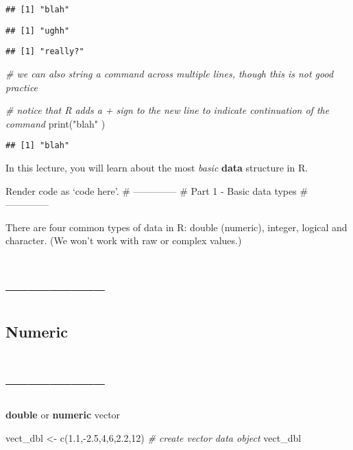 \documentclass[
]{article}
\newenvironment{Shaded}{\begin{snugshade}}{\end{snugshade}}
\newcommand{\CommentTok}[1]{\textcolor[rgb]{0.56,0.35,0.01}{\textit{#1}}}
\newcommand{\DecValTok}[1]{\textcolor[rgb]{0.00,0.00,0.81}{#1}}
\newcommand{\FloatTok}[1]{\textcolor[rgb]{0.00,0.00,0.81}{#1}}
\newcommand{\FunctionTok}[1]{\textcolor[rgb]{0.00,0.00,0.00}{#1}}
\newcommand{\NormalTok}[1]{#1}
\newcommand{\OtherTok}[1]{\textcolor[rgb]{0.56,0.35,0.01}{#1}}
\newcommand{\SpecialCharTok}[1]{\textcolor[rgb]{0.00,0.00,0.00}{#1}}
\newcommand{\StringTok}[1]{\textcolor[rgb]{0.31,0.60,0.02}{#1}}
\begin{document}
\begin{verbatim}
## [1] "blah"
\end{verbatim}

\begin{verbatim}
## [1] "ughh"
\end{verbatim}

\begin{verbatim}
## [1] "really?"
\end{verbatim}

\begin{Shaded}
\begin{Highlighting}[]
\CommentTok{\# we can also string a command across multiple lines, though this is not good practice}

\CommentTok{\# notice that R adds a + sign to the new line to indicate continuation of the command}
\FunctionTok{print}\NormalTok{(}\StringTok{"blah"}
\NormalTok{)}
\end{Highlighting}
\end{Shaded}

\begin{verbatim}
## [1] "blah"
\end{verbatim}

In this lecture, you will learn about the most \emph{basic}
\textbf{data} structure in R.

Render code as `code here'. \# -------------- \# Part 1 - Basic data
types \# --------------

There are four common types of data in R: double (numeric), integer,
logical and character. (We won't work with raw or complex values.)

\hypertarget{section-8}{%
\section{--------------}\label{section-8}}

\hypertarget{numeric}{%
\subsection{Numeric}\label{numeric}}

\hypertarget{section-9}{%
\section{--------------}\label{section-9}}

\textbf{double} or \textbf{numeric} vector

\begin{Shaded}
\begin{Highlighting}[]
\NormalTok{vect\_dbl }\OtherTok{\textless{}{-}} \FunctionTok{c}\NormalTok{(}\FloatTok{1.1}\NormalTok{,}\SpecialCharTok{{-}}\FloatTok{2.5}\NormalTok{,}\DecValTok{4}\NormalTok{,}\DecValTok{6}\NormalTok{,}\FloatTok{2.2}\NormalTok{,}\DecValTok{12}\NormalTok{) }\CommentTok{\# create vector data object}
\NormalTok{vect\_dbl}
\end{Highlighting}
\end{Shaded}
\end{document}
